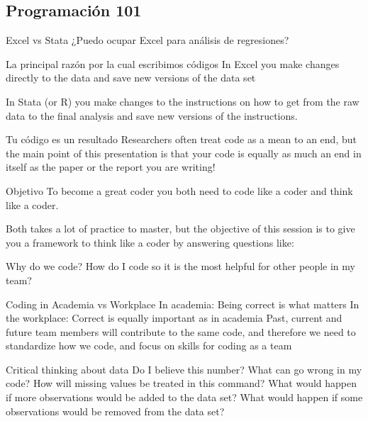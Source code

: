 \documentclass[11pt, aspectratio=169, compress]{beamer}
\begin{document}
\subsection{Programación 101}
\begin{frame}{Excel vs Stata}
	¿Puedo ocupar Excel para análisis de regresiones?
\end{frame}
\begin{frame}{La principal razón por la cual escribimos códigos}
	In Excel you make changes directly to the data and save new versions of the data set

	In Stata (or R) you make changes to the instructions on how to get from the raw data to the final analysis and save new versions of the instructions.
\end{frame}
\begin{frame}{Tu código es un resultado}
	Researchers often treat code as a mean to an end, but the main point of this presentation is that your code is equally as much an end in itself as the paper or the report you are writing!
\end{frame}
\begin{frame}{Objetivo}
	To become a great coder you both need to code like a coder and think like a coder. 

	Both takes a lot of practice to master, but the objective of this session is to give you a framework to think like a coder by answering questions like:

	Why do we code?
	How do I code so it is the most helpful for other people in my team?

\end{frame}
\begin{frame}{Coding in Academia vs Workplace}
	In academia:
	Being correct is what matters
	In the workplace:
	Correct is equally important as in academia
	Past, current and future team members will contribute to the same code, and therefore we need to standardize how we code, and focus on skills for coding as a team
\end{frame}
\begin{frame}{Critical thinking about data}
	Do I believe this number? 
	What can go wrong in my code? 
	How will missing values be treated in this command? 
	What would happen if more observations would be added to the data set?
	What would happen if some observations would be removed from the data set?
\end{frame}
\end{document}
